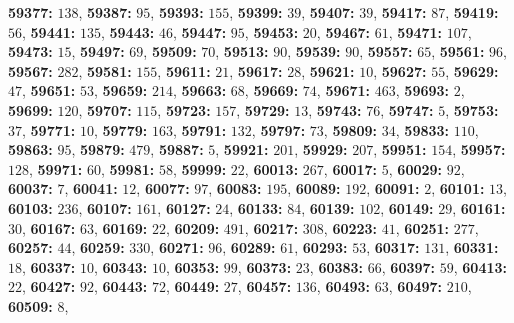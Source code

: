 \textsf{\bfseries 59377:} $138$, \textsf{\bfseries 59387:} $95$, \textsf{\bfseries 59393:} $155$, \textsf{\bfseries 59399:} $39$, \textsf{\bfseries 59407:} $39$, \textsf{\bfseries 59417:} $87$, \textsf{\bfseries 59419:} $56$, \textsf{\bfseries 59441:} $135$, \textsf{\bfseries 59443:} $46$, \textsf{\bfseries 59447:} $95$, \textsf{\bfseries 59453:} $20$, \textsf{\bfseries 59467:} $61$, \textsf{\bfseries 59471:} $107$, \textsf{\bfseries 59473:} $15$, \textsf{\bfseries 59497:} $69$, \textsf{\bfseries 59509:} $70$, \textsf{\bfseries 59513:} $90$, \textsf{\bfseries 59539:} $90$, \textsf{\bfseries 59557:} $65$, \textsf{\bfseries 59561:} $96$, \textsf{\bfseries 59567:} $282$, \textsf{\bfseries 59581:} $155$, \textsf{\bfseries 59611:} $21$, \textsf{\bfseries 59617:} $28$, \textsf{\bfseries 59621:} $10$, \textsf{\bfseries 59627:} $55$, \textsf{\bfseries 59629:} $47$, \textsf{\bfseries 59651:} $53$, \textsf{\bfseries 59659:} $214$, \textsf{\bfseries 59663:} $68$, \textsf{\bfseries 59669:} $74$, \textsf{\bfseries 59671:} $463$, \textsf{\bfseries 59693:} $2$, \textsf{\bfseries 59699:} $120$, \textsf{\bfseries 59707:} $115$, \textsf{\bfseries 59723:} $157$, \textsf{\bfseries 59729:} $13$, \textsf{\bfseries 59743:} $76$, \textsf{\bfseries 59747:} $5$, \textsf{\bfseries 59753:} $37$, \textsf{\bfseries 59771:} $10$, \textsf{\bfseries 59779:} $163$, \textsf{\bfseries 59791:} $132$, \textsf{\bfseries 59797:} $73$, \textsf{\bfseries 59809:} $34$, \textsf{\bfseries 59833:} $110$, \textsf{\bfseries 59863:} $95$, \textsf{\bfseries 59879:} $479$, \textsf{\bfseries 59887:} $5$, \textsf{\bfseries 59921:} $201$, \textsf{\bfseries 59929:} $207$, \textsf{\bfseries 59951:} $154$, \textsf{\bfseries 59957:} $128$, \textsf{\bfseries 59971:} $60$, \textsf{\bfseries 59981:} $58$, \textsf{\bfseries 59999:} $22$, \textsf{\bfseries 60013:} $267$, \textsf{\bfseries 60017:} $5$, \textsf{\bfseries 60029:} $92$, \textsf{\bfseries 60037:} $7$, \textsf{\bfseries 60041:} $12$, \textsf{\bfseries 60077:} $97$, \textsf{\bfseries 60083:} $195$, \textsf{\bfseries 60089:} $192$, \textsf{\bfseries 60091:} $2$, \textsf{\bfseries 60101:} $13$, \textsf{\bfseries 60103:} $236$, \textsf{\bfseries 60107:} $161$, \textsf{\bfseries 60127:} $24$, \textsf{\bfseries 60133:} $84$, \textsf{\bfseries 60139:} $102$, \textsf{\bfseries 60149:} $29$, \textsf{\bfseries 60161:} $30$, \textsf{\bfseries 60167:} $63$, \textsf{\bfseries 60169:} $22$, \textsf{\bfseries 60209:} $491$, \textsf{\bfseries 60217:} $308$, \textsf{\bfseries 60223:} $41$, \textsf{\bfseries 60251:} $277$, \textsf{\bfseries 60257:} $44$, \textsf{\bfseries 60259:} $330$, \textsf{\bfseries 60271:} $96$, \textsf{\bfseries 60289:} $61$, \textsf{\bfseries 60293:} $53$, \textsf{\bfseries 60317:} $131$, \textsf{\bfseries 60331:} $18$, \textsf{\bfseries 60337:} $10$, \textsf{\bfseries 60343:} $10$, \textsf{\bfseries 60353:} $99$, \textsf{\bfseries 60373:} $23$, \textsf{\bfseries 60383:} $66$, \textsf{\bfseries 60397:} $59$, \textsf{\bfseries 60413:} $22$, \textsf{\bfseries 60427:} $92$, \textsf{\bfseries 60443:} $72$, \textsf{\bfseries 60449:} $27$, \textsf{\bfseries 60457:} $136$, \textsf{\bfseries 60493:} $63$, \textsf{\bfseries 60497:} $210$, \textsf{\bfseries 60509:} $8$, 
